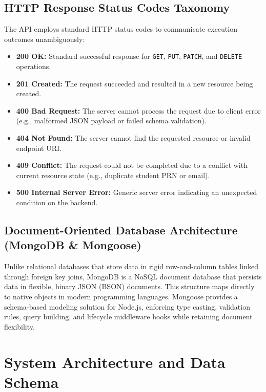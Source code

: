 \documentclass[11pt,a4paper]{article}
\begin{document}
\subsection{HTTP Response Status Codes Taxonomy}
The API employs standard HTTP status codes to communicate execution outcomes unambiguously:
\begin{itemize}
    \item \textbf{200 OK:} Standard successful response for \texttt{GET}, \texttt{PUT}, \texttt{PATCH}, and \texttt{DELETE} operations.
    \item \textbf{201 Created:} The request succeeded and resulted in a new resource being created.
    \item \textbf{400 Bad Request:} The server cannot process the request due to client error (e.g., malformed JSON payload or failed schema validation).
    \item \textbf{404 Not Found:} The server cannot find the requested resource or invalid endpoint URI.
    \item \textbf{409 Conflict:} The request could not be completed due to a conflict with current resource state (e.g., duplicate student PRN or email).
    \item \textbf{500 Internal Server Error:} Generic server error indicating an unexpected condition on the backend.
\end{itemize}

\subsection{Document-Oriented Database Architecture (MongoDB \& Mongoose)}
Unlike relational databases that store data in rigid row-and-column tables linked through foreign key joins, MongoDB is a NoSQL document database that persists data in flexible, binary JSON (BSON) documents. This structure maps directly to native objects in modern programming languages. Mongoose provides a schema-based modeling solution for Node.js, enforcing type casting, validation rules, query building, and lifecycle middleware hooks while retaining document flexibility.

\newpage
\section{System Architecture and Data Schema}
\end{document}
